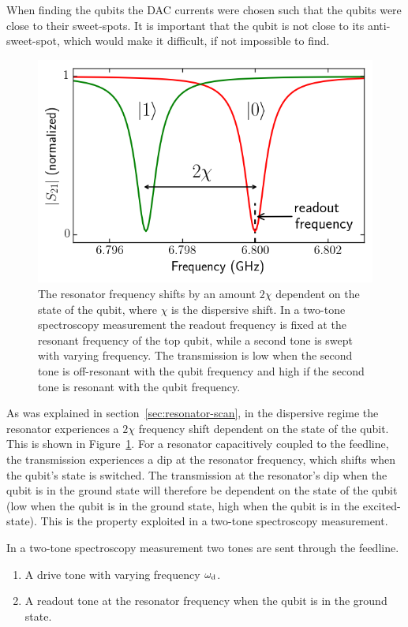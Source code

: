         When finding the qubits the DAC currents were chosen such that the qubits were close to their sweet-spots. It is important that the qubit is not close to its anti-sweet-spot, which would make it difficult, if not impossible to find.

        \begin{figure}[tb]
          \centering
          \includegraphics[width=.5\textwidth]{../Figures/Qubit characterization/dispersive shift.png}
          \caption{The resonator frequency shifts by an amount $2\chi$ dependent on the state of the qubit, where $\chi$ is the dispersive shift. In a two-tone spectroscopy measurement the readout frequency is fixed at the resonant frequency of the top qubit, while a second tone is swept with varying frequency. The transmission is low when the second tone is off-resonant with the qubit frequency and high if the second tone is resonant with the qubit frequency.}
          \label{fig:dispersive shift}
        \end{figure}

        As was explained in section~\ref{sec:resonator-scan}, in the dispersive regime the resonator experiences a $2 \chi$ frequency shift dependent on the state of the qubit. This is shown in Figure~\ref{fig:dispersive shift}. For a resonator capacitively coupled to the feedline, the transmission experiences a dip at the resonator frequency, which shifts when the qubit's state is switched. The transmission at the resonator's dip when the qubit is in the ground state will therefore be dependent on the state of the qubit (low when the qubit is in the ground state, high when the qubit is in the excited-state). This is the property exploited in a two-tone spectroscopy measurement.

        In a two-tone spectroscopy measurement two tones are sent through the feedline.
        \begin{enumerate}
          \item A drive tone with varying frequency $\omega_\text{d}$.
          \item A readout tone at the resonator frequency when the qubit is in the ground state.
        \end{enumerate}

